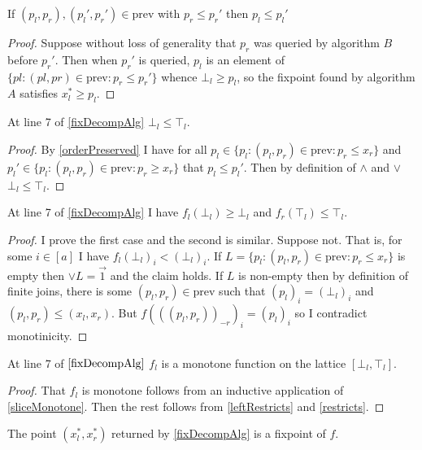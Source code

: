 \begin{lemma}\label{orderPreserved}
  If $(p_l, p_r), (p_l', p_r') \in \text{prev}$ with $p_r \leq p_r'$ then
  $p_l \leq p_l'$
\end{lemma}
\begin{proof}
  Suppose without loss of generality that $p_r$ was queried by algorithm $B$
  before $p_r'$. Then when $p_r'$ is queried, $p_l$ is an element of
  $\{pl : (pl, pr) \in \text{prev} : p_r \leq p_r'\}$ whence $\bot_l \geq p_l$,
  so the fixpoint found by algorithm $A$ satisfies $x_l^* \geq p_l$.
\end{proof}
\begin{lemma}
  At line 7 of \cref{fixDecompAlg} $\bot_l \leq \top_l$.
\end{lemma}
\begin{proof}
  By \cref{orderPreserved} I have for all 
  $p_l \in \{p_l : (p_l, p_r) \in \text{prev} : p_r \leq x_r \}$ and
  $p_l' \in \{p_l : (p_l, p_r) \in \text{prev} : p_r \geq x_r \}$ that
  $p_l \leq p_l'$. Then by definition of $\wedge$ and $\vee$ $\bot_l \leq \top_l$.
\end{proof}
\begin{lemma}\label{leftRestricts}
  At line 7 of \cref{fixDecompAlg} I have $f_l(\bot_l) \geq \bot_l$ and $f_r(\top_l) \leq \top_l$.
\end{lemma}
\begin{proof}
  I prove the first case and the second is similar. Suppose not. That is,
  for some $i \in [a]$ I have $f_l(\bot_l)_i < (\bot_l)_i$. If 
  $L = \{p_l : (p_l, p_r) \in \text{prev} : p_r \leq x_r \}$ is empty then
  $\vee L = \vec{1}$ and the claim holds. If $L$ is non-empty then by definition
  of finite joins, there is some $(p_l, p_r) \in \text{prev}$ such that $(p_l)_i = (\bot_l)_i$
  and $(p_l, p_r) \leq (x_l, x_r)$. But $f(((p_l, p_r))_{-r})_i = (p_l)_i$ so
  I contradict monotinicity.
\end{proof}
\begin{lemma}
  At line 7 of $\cref{fixDecompAlg}$ $f_l$ is a monotone function on the lattice
  $[\bot_l, \top_l]$.
\end{lemma}
\begin{proof}
  That $f_l$ is monotone follows from an inductive application of \cref{sliceMonotone}.
  Then the rest follows from \cref{leftRestricts} and \cref{restricts}.
\end{proof}
\begin{prop}
  The point $(x_l^*, x_r^*)$ returned by \cref{fixDecompAlg} is a fixpoint of $f$.
\end{prop}
